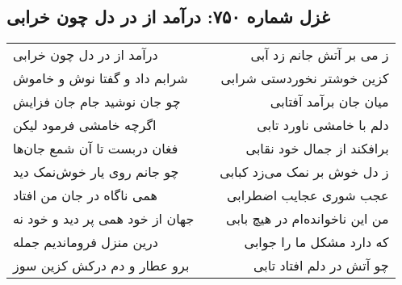 \begin{center}
\section*{غزل شماره ۷۵۰: درآمد از در دل چون خرابی}
\label{sec:750}
\begin{longtable}{l p{0.5cm} r}
درآمد از در دل چون خرابی
&&
ز می بر آتش جانم زد آبی
\\
شرابم داد و گفتا نوش و خاموش
&&
کزین خوشتر نخوردستی شرابی
\\
چو جان نوشید جام جان فزایش
&&
میان جان برآمد آفتابی
\\
اگرچه خامشی فرمود لیکن
&&
دلم با خامشی ناورد تابی
\\
فغان دربست تا آن شمع جان‌ها
&&
برافکند از جمال خود نقابی
\\
چو جانم روی یار خوش‌نمک دید
&&
ز دل خوش بر نمک می‌زد کبابی
\\
همی ناگاه در جان من افتاد
&&
عجب شوری عجایب اضطرابی
\\
جهان از خود همی پر دید و خود نه
&&
من این ناخوانده‌ام در هیچ بابی
\\
درین منزل فروماندیم جمله
&&
که دارد مشکل ما را جوابی
\\
برو عطار و دم درکش کزین سوز
&&
چو آتش در دلم افتاد تابی
\\
\end{longtable}
\end{center}

